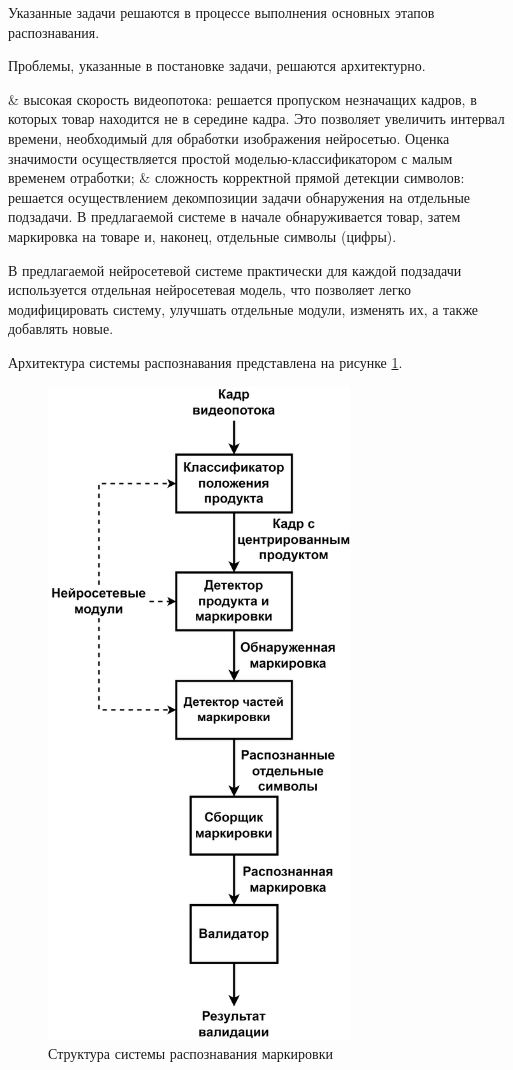 Указанные задачи решаются в процессе выполнения основных этапов распознавания.

Проблемы, указанные в постановке задачи, решаются архитектурно.

\begin{easylistNum}
    & высокая скорость видеопотока: решается пропуском незначащих кадров, в которых товар находится не в середине кадра. Это позволяет увеличить интервал времени, необходимый для обработки изображения нейросетью. Оценка значимости осуществляется простой моделью-классификатором с малым временем отработки;
    & сложность корректной прямой детекции символов: решается осуществлением декомпозиции задачи обнаружения на отдельные подзадачи. В предлагаемой системе в начале обнаруживается товар, затем маркировка на товаре и, наконец, отдельные символы (цифры).
\end{easylistNum}

В предлагаемой нейросетевой системе практически для каждой подзадачи используется отдельная нейросетевая модель, что позволяет легко модифицировать систему, улучшать отдельные модули, изменять их, а также добавлять новые. 

Архитектура системы распознавания представлена на рисунке \ref{fig:structure}.

\begin{figure}[!ht]
	\centering
	\includegraphics[width=8cm]{man-source/images/ch4/savushkin_structure.png}
	\caption{Структура системы распознавания маркировки}
	\label{fig:structure}
\end{figure}

